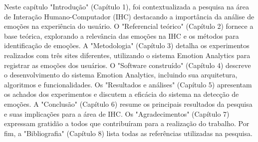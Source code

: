 Neste capítulo "Introdução" (Capítulo 1), foi contextualizada a pesquisa na área de Interação Humano-Computador (IHC) destacando a importância da análise de emoções na experiência do usuário. O "Referencial teórico" (Capítulo 2) fornece a base teórica, explorando a relevância das emoções na IHC e os métodos para identificação de emoções. A "Metodologia" (Capítulo 3) detalha os experimentos realizados com três sites diferentes, utilizando o sistema Emotion Analytics para registrar as emoções dos usuários. O "Software construído" (Capítulo 4) descreve o desenvolvimento do sistema Emotion Analytics, incluindo sua arquitetura, algoritmos e funcionalidades. Os "Resultados e análises" (Capítulo 5) apresentam os achados dos experimentos e discutem a eficácia do sistema na detecção de emoções. A "Conclusão" (Capítulo 6) resume os principais resultados da pesquisa e suas implicações para a área de IHC. Os "Agradecimentos" (Capítulo 7) expressam gratidão a todos que contribuíram para a realização do trabalho. Por fim, a "Bibliografia" (Capítulo 8) lista todas as referências utilizadas na pesquisa.
